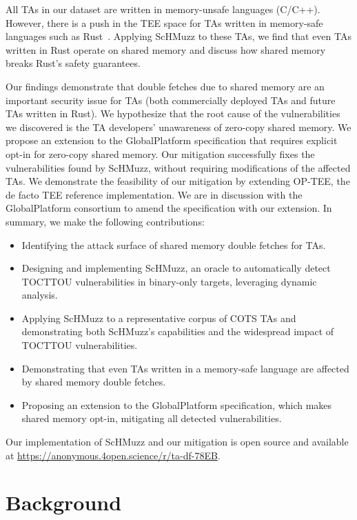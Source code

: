 \documentclass[conference]{IEEEtran}
\newcommand{\sysname}{ScHMuzz\xspace}
\newcommand{\optee}{OP-TEE\xspace}
\newcommand{\opensource}{\url{https://anonymous.4open.science/r/ta-df-78EB}\xspace}
\begin{document}
All TAs in our dataset are written in memory-unsafe languages (C/C++). 
However, there is a push in the TEE space for TAs written in memory-safe languages such as 
Rust~\cite{rustee,teaclave}. Applying \sysname to these TAs, we find that even TAs written 
in Rust operate on shared memory and discuss how shared memory breaks Rust's safety guarantees.

Our findings demonstrate that double fetches due to shared memory are an important 
security issue for TAs (both commercially deployed TAs and future TAs written in Rust). 
We hypothesize that the root cause of the vulnerabilities we discovered is the 
TA developers' unawareness of zero-copy shared memory. 
We propose an extension to the GlobalPlatform specification that requires explicit opt-in for 
zero-copy shared memory. Our mitigation successfully fixes the vulnerabilities found by \sysname, 
without requiring modifications of the affected TAs. We demonstrate the feasibility of our mitigation 
by extending \optee, the de facto TEE reference implementation. We are in discussion 
with the GlobalPlatform consortium to amend the specification with our extension.
In summary, we make the following contributions:

\begin{itemize}
    \item Identifying the attack surface of shared memory double fetches for TAs.
    \item Designing and implementing \sysname, an oracle to automatically detect TOCTTOU vulnerabilities 
    in binary-only targets, leveraging dynamic analysis.
    \item Applying \sysname to a representative corpus of COTS TAs and demonstrating both \sysname's capabilities 
    and the widespread impact of TOCTTOU vulnerabilities.
    \item Demonstrating that even TAs written in a memory-safe language are affected by shared memory 
    double fetches.
    \item Proposing an extension to the GlobalPlatform specification, which makes shared memory 
    opt-in, mitigating all detected vulnerabilities.
\end{itemize}

Our implementation of \sysname and our mitigation is open source and available at \opensource.

\section{Background}\label{sec:background}
\end{document}
